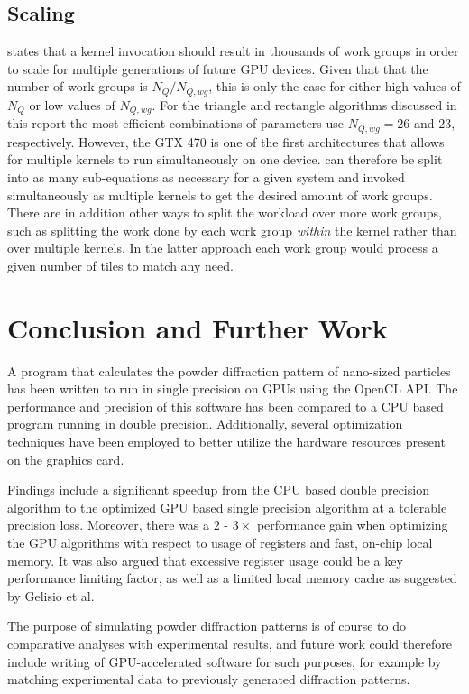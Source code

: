 \documentclass[11pt,twoside]{report}
\begin{document}
\section{Scaling}
 states that a kernel invocation should result in thousands of work groups in order to scale for multiple  generations of future  GPU devices. Given that that the number of work groups is $N_{Q}/N_{Q,wg}$, this is only the case for either high values of $N_{Q}$ or low values of $N_{Q,wg}$. For the triangle and rectangle algorithms discussed in this report the most efficient combinations of parameters use $N_{Q,wg} = 26$ and $23$, respectively. However, the GTX 470 is one of the first architectures that allows for multiple kernels to run simultaneously on one device.  can therefore be split into as many sub-equations as necessary for a given system and invoked simultaneously as multiple kernels to get the desired amount of work groups.  There are in addition other ways to split the workload over more work groups, such as splitting the work done by each work group {\it within} the kernel rather than over multiple kernels. In the latter approach each work group would process a given number of tiles to match any need.

\chapter{Conclusion and Further Work}
A program that calculates the powder diffraction pattern of nano-sized particles has been written to run in single precision on GPUs using the OpenCL API. The performance  and precision of this software has been compared to a CPU based program running in double precision. Additionally, several optimization techniques have been employed to better utilize the hardware resources present on the graphics card.

\indent Findings include a significant speedup from the CPU based double precision algorithm to the optimized GPU based single precision algorithm at a tolerable  precision loss. Moreover, there was a $2$ - $3\times$ performance gain when optimizing the GPU algorithms with respect to usage of registers and fast, on-chip local memory. It was also argued that excessive register usage could be a key performance limiting factor, as well as a limited local memory cache as suggested by  Gelisio et al.


\indent The purpose of simulating powder diffraction patterns is of course to do comparative analyses with experimental results, and future work could therefore include writing of GPU-accelerated software for such purposes, for example by matching experimental data to previously generated diffraction patterns. 
\end{document}
